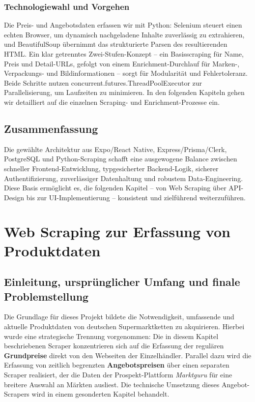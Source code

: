 \documentclass[12pt, a4paper]{report} %
\newcommand{\authorinitials}{} %
\begin{document}
\subsection{Technologiewahl und Vorgehen}
Die Preis- und Angebotsdaten erfassen wir mit Python: Selenium steuert einen echten Browser, um dynamisch nachgeladene Inhalte zuverlässig zu extrahieren, und BeautifulSoup übernimmt das strukturierte Parsen des resultierenden HTML. Ein klar getrenntes Zwei-Stufen-Konzept – ein Basisscraping für Name, Preis und Detail-URLs, gefolgt von einem Enrichment-Durchlauf für Marken-, Verpackungs- und Bildinformationen – sorgt für Modularität und Fehlertoleranz. Beide Schritte nutzen concurrent.futures.ThreadPoolExecutor zur Parallelisierung, um Laufzeiten zu minimieren. In den folgenden Kapiteln gehen wir detailliert auf die einzelnen Scraping- und Enrichment-Prozesse ein.

\section{Zusammenfassung}
Die gewählte Architektur aus Expo/React Native, Express/Prisma/Clerk, PostgreSQL und Python-Scraping schafft eine ausgewogene Balance zwischen schneller Frontend-Entwicklung, typgesicherter Backend-Logik, sicherer Authentifizierung, zuverlässiger Datenhaltung und robustem Data-Engineering. Diese Basis ermöglicht es, die folgenden Kapitel – von Web Scraping über API-Design bis zur UI-Implementierung – konsistent und zielführend weiterzuführen.

\chapter{Web Scraping zur Erfassung von Produktdaten}
\renewcommand{\authorinitials}{MK}
\label{chap:web_scraping}

\section{Einleitung, ursprünglicher Umfang und finale Problemstellung}
Die Grundlage für dieses Projekt bildete die Notwendigkeit, umfassende und aktuelle Produktdaten von deutschen Supermarktketten zu akquirieren. Hierbei wurde eine strategische Trennung vorgenommen: Die in diesem Kapitel beschriebenen Scraper konzentrieren sich auf die Erfassung der regulären \textbf{Grundpreise} direkt von den Webseiten der Einzelhändler. Parallel dazu wird die Erfassung von zeitlich begrenzten \textbf{Angebotspreisen} über einen separaten Scraper realisiert, der die Daten der Prospekt-Plattform \textit{Marktguru} für eine breitere Auswahl an Märkten ausliest. Die technische Umsetzung dieses Angebot-Scrapers wird in einem gesonderten Kapitel behandelt.
\end{document}

